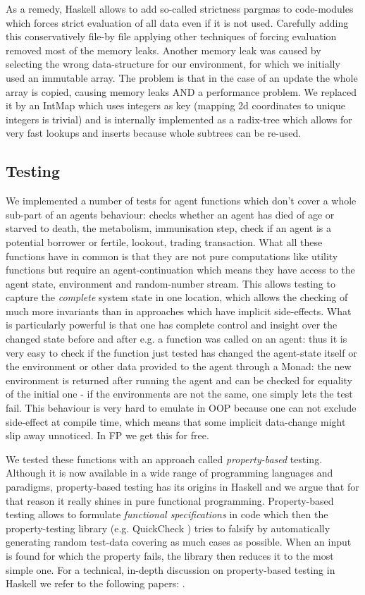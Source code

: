 As a remedy, Haskell allows to add so-called strictness pargmas to code-modules which forces strict evaluation of all data even if it is not used. Carefully adding this conservatively file-by file applying other techniques of forcing evaluation removed most of the memory leaks. Another memory leak was caused by selecting the wrong data-structure for our environment, for which we initially used an immutable array. The problem is that in the case of an update the whole array is copied, causing memory leaks AND a performance problem. We replaced it by an IntMap which uses integers as key (mapping 2d coordinates to unique integers is trivial) and is internally implemented as a radix-tree which allows for very fast lookups and inserts because whole subtrees can be re-used.

\subsection{Testing}
We implemented a number of tests for agent functions which don't cover a whole sub-part of an agents behaviour: checks whether an agent has died of age or starved to death, the metabolism, immunisation step, check if an agent is a potential borrower or fertile, lookout, trading transaction. What all these functions have in common is that they are not pure computations like utility functions but require an agent-continuation which means they have access to the agent state, environment and random-number stream. This allows testing to capture the \textit{complete} system state in one location, which allows the checking of much more invariants than in approaches which have implicit side-effects.
What is particularly powerful is that one has complete control and insight over the changed state before and after e.g. a function was called on an agent: thus it is very easy to check if the function just tested has changed the agent-state itself or the environment or other data provided to the agent through a Monad: the new environment is returned after running the agent and can be checked for equality of the initial one - if the environments are not the same, one simply lets the test fail. This behaviour is very hard to emulate in OOP because one can not exclude side-effect at compile time, which means that some implicit data-change might slip away unnoticed. In FP we get this for free.

We tested these functions with an approach called \textit{property-based} testing. Although it is now available in a wide range of programming languages and paradigms, property-based testing has its origins in Haskell \cite{claessen_quickcheck:_2000,claessen_testing_2002} and we argue that for that reason it really shines in pure functional programming. Property-based testing allows to formulate \textit{functional specifications} in code which then the property-testing library (e.g. QuickCheck \cite{claessen_quickcheck:_2000}) tries to falsify by automatically generating random test-data covering as much cases as possible. When an input is found for which the property fails, the library then reduces it to the most simple one. For a technical, in-depth discussion on property-based testing in Haskell we refer to the following papers: \cite{claessen_quickcheck:_2000,claessen_testing_2002}.

